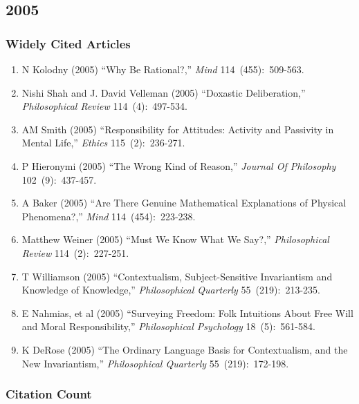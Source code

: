 \documentclass[
  10pt,
  letterpaper,
  DIV=11,
  numbers=noendperiod,
  twoside]{scrartcl}
\providecommand{\tightlist}{%
  \setlength{\itemsep}{0pt}\setlength{\parskip}{0pt}}\usepackage{longtable,booktabs,array}
\begin{document}
\newpage

\subsection{2005}\label{sec-s2005}

\subsubsection*{Widely Cited Articles}\label{widely-cited-articles-49}

\begin{enumerate}
\def\labelenumi{\arabic{enumi}.}
\tightlist
\item
  N Kolodny (2005) ``Why Be Rational?,'' \emph{Mind} 114~(455):~509-563.
\item
  Nishi Shah and J. David Velleman (2005) ``Doxastic Deliberation,''
  \emph{Philosophical Review} 114~(4):~497-534.
\item
  AM Smith (2005) ``Responsibility for Attitudes: Activity and Passivity
  in Mental Life,'' \emph{Ethics} 115~(2):~236-271.
\item
  P Hieronymi (2005) ``The Wrong Kind of Reason,'' \emph{Journal Of
  Philosophy} 102~(9):~437-457.
\item
  A Baker (2005) ``Are There Genuine Mathematical Explanations of
  Physical Phenomena?,'' \emph{Mind} 114~(454):~223-238.
\item
  Matthew Weiner (2005) ``Must We Know What We Say?,''
  \emph{Philosophical Review} 114~(2):~227-251.
\item
  T Williamson (2005) ``Contextualism, Subject-Sensitive Invariantism
  and Knowledge of Knowledge,'' \emph{Philosophical Quarterly}
  55~(219):~213-235.
\item
  E Nahmias, et al (2005) ``Surveying Freedom: Folk Intuitions About
  Free Will and Moral Responsibility,'' \emph{Philosophical Psychology}
  18~(5):~561-584.
\item
  K DeRose (2005) ``The Ordinary Language Basis for Contextualism, and
  the New Invariantism,'' \emph{Philosophical Quarterly}
  55~(219):~172-198.
\end{enumerate}

\subsubsection*{Citation Count}\label{sec-count-2005}
\end{document}
